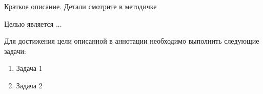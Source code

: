 \Introduction

Краткое описание. Детали смотрите в методичке

Целью является ...

Для достижения цели описанной в аннотации необходимо выполнить следующие задачи:

\begin{enumerate}
  \item Задача 1
  \item Задача 2
\end{enumerate}

